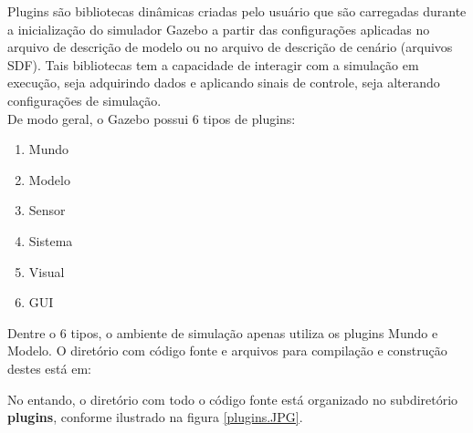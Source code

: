 Plugins são bibliotecas dinâmicas criadas pelo usuário que são carregadas durante a inicialização do simulador Gazebo a partir das configurações aplicadas no arquivo de descrição de modelo ou no arquivo de descrição de cenário (arquivos SDF). Tais bibliotecas tem a capacidade de interagir com a simulação em execução, seja adquirindo dados e aplicando sinais de controle, seja alterando configurações de simulação. \\

De modo geral, o Gazebo possui 6 tipos de plugins:

\begin{enumerate}[noitemsep]
\item Mundo
\item Modelo
\item Sensor
\item Sistema
\item Visual
\item GUI
\end{enumerate}

Dentre o 6 tipos, o ambiente de simulação apenas utiliza os plugins Mundo e Modelo. O diretório com código fonte e arquivos para compilação e construção destes está em:


No entando, o diretório com todo o código fonte está organizado no subdiretório \textbf{plugins}, conforme ilustrado na figura \ref{plugins.JPG}.

